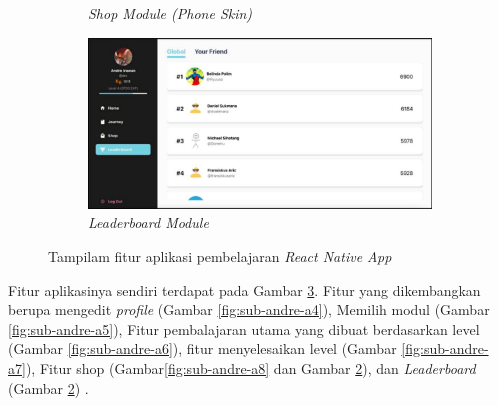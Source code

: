 \begin{figure}[H]
\begin{subfigure}[b]{0.4\textwidth}
		\caption{\textit{Shop Module (Phone Skin)}}
		\label{fig:sub-andre-a9}
	\end{subfigure}
	\hfill
	\begin{subfigure}[b]{0.4\textwidth}
		\centering
		\includegraphics[width=\linewidth]{contents/chapter-2/images/Andre-a10.png}
		\caption{\textit{Leaderboard Module}}
		\label{fig:sub-andre-a10}
	\end{subfigure}
	\caption{Tampilam fitur aplikasi pembelajaran \textit{React Native App}\cite{OctalysisFrameworkAndre}}
	\label{fig:interface fitur pembelajaran React Native}
\end{figure}
Fitur aplikasinya sendiri terdapat pada Gambar \ref*{fig:interface fitur pembelajaran React Native}. Fitur yang dikembangkan berupa mengedit \textit{profile} (Gambar \ref*{fig:sub-andre-a4}), Memilih modul (Gambar \ref*{fig:sub-andre-a5}), Fitur pembalajaran utama yang dibuat berdasarkan level (Gambar \ref*{fig:sub-andre-a6}),
fitur menyelesaikan level (Gambar \ref*{fig:sub-andre-a7}), Fitur shop (Gambar\ref*{fig:sub-andre-a8} dan Gambar \ref*{fig:sub-andre-a10}), dan \textit{Leaderboard} (Gambar \ref*{fig:sub-andre-a10}) \cite{OctalysisFrameworkAndre}.

